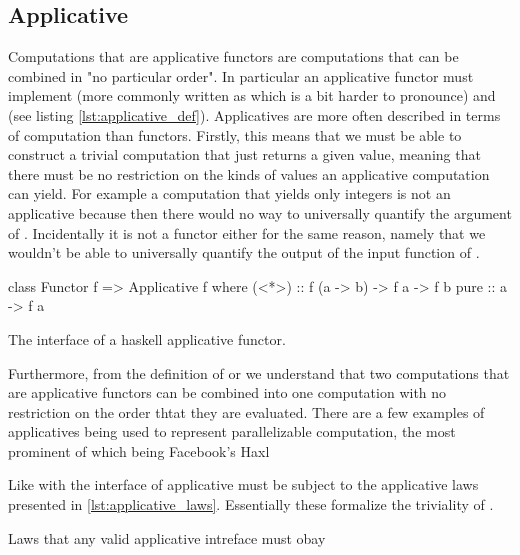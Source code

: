 \subsection{Applicative}

Computations that are applicative
\cite{mcbrideApplicativeProgrammingEffects2008} functors are
computations that can be combined in "no particular order". In
particular an applicative functor must implement  (more commonly written as \hask{<*>} which is a
bit harder to pronounce) and  (see listing
\ref{lst:applicative_def}). Applicatives are more often described in
terms of computation than functors. Firstly, this means that we must
be able to construct a trivial computation that just returns a given
value, meaning that there must be no restriction on the kinds of
values an applicative computation can yield. For example a computation
that yields only integers is not an applicative because then there
would no way to universally quantify the argument of
. Incidentally it is not a functor either for the same
reason, namely that we wouldn't be able to universally quantify the
output of the input function of .

\begin{code}
\begin{haskellcode}
class Functor f => Applicative f  where
  (<*>) :: f (a -> b) -> f a -> f b
  pure :: a -> f a
\end{haskellcode}
\label{lst:applicative_def}
\caption{The interface of a haskell applicative functor.}
\end{code}

Furthermore, from the definition of  or \hask{<*>} we
understand that two computations that are applicative functors can be
combined into one computation with no restriction on the order thtat
they are evaluated. There are a few examples of applicatives being
used to represent parallelizable computation, the most prominent of
which being Facebook's Haxl \cite{marlowHaxlProjectFacebook2013}

Like with  the interface of applicative must be subject
to the applicative laws presented in
\ref{lst:applicative_laws}. Essentially these formalize the triviality
of .

\begin{code}
\label{lst:applicative_laws}
\caption{Laws that any valid applicative intreface must obay}
\end{code}

